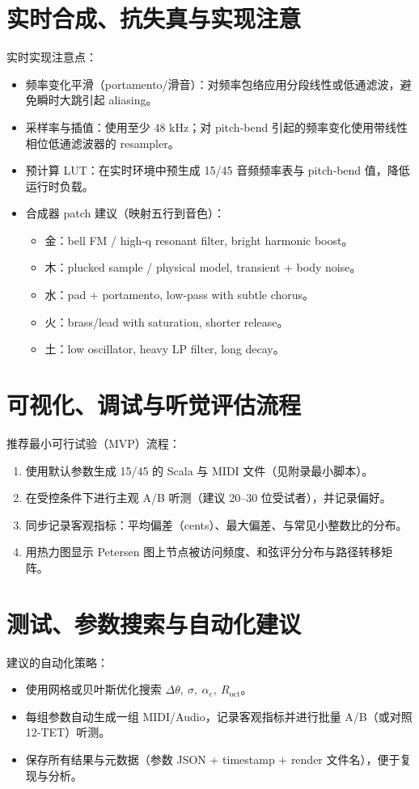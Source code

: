 \documentclass{article}
\begin{document}
\section{实时合成、抗失真与实现注意}
实时实现注意点：
\begin{itemize}
  \item 频率变化平滑（portamento/滑音）：对频率包络应用分段线性或低通滤波，避免瞬时大跳引起 aliasing。
  \item 采样率与插值：使用至少 48 kHz；对 pitch‑bend 引起的频率变化使用带线性相位低通滤波器的 resampler。
  \item 预计算 LUT：在实时环境中预生成 15/45 音频频率表与 pitch‑bend 值，降低运行时负载。
  \item 合成器 patch 建议（映射五行到音色）：
    \begin{itemize}
      \item 金：bell FM / high‑q resonant filter, bright harmonic boost。
      \item 木：plucked sample / physical model, transient + body noise。
      \item 水：pad + portamento, low‑pass with subtle chorus。
      \item 火：brass/lead with saturation, shorter release。
      \item 土：low oscillator, heavy LP filter, long decay。
    \end{itemize}
\end{itemize}

\section{可视化、调试与听觉评估流程}
推荐最小可行试验（MVP）流程：
\begin{enumerate}
  \item 使用默认参数生成 15/45 的 Scala 与 MIDI 文件（见附录最小脚本）。
  \item 在受控条件下进行主观 A/B 听测（建议 20–30 位受试者），并记录偏好。
  \item 同步记录客观指标：平均偏差（cents）、最大偏差、与常见小整数比的分布。
  \item 用热力图显示 Petersen 图上节点被访问频度、和弦评分分布与路径转移矩阵。
\end{enumerate}

\section{测试、参数搜索与自动化建议}
建议的自动化策略：
\begin{itemize}
  \item 使用网格或贝叶斯优化搜索 $\Delta\theta,\ \sigma,\ \alpha_e,\ R_{\mathrm{oct}}$。
  \item 每组参数自动生成一组 MIDI/Audio，记录客观指标并进行批量 A/B（或对照 12‑TET）听测。
  \item 保存所有结果与元数据（参数 JSON + timestamp + render 文件名），便于复现与分析。
\end{itemize}
\end{document}
